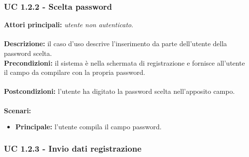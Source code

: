 \documentclass[a4paper,11pt]{article}
\begin{document}
\subsubsection{UC 1.2.2 - Scelta password}

\textbf{Attori principali:} \textit{utente non autenticato}.\\
\\
\textbf{Descrizione:} il caso d'uso descrive l'inserimento da parte dell'utente della password scelta.
\\
\textbf{Precondizioni:} il sistema è nella schermata di registrazione e fornisce all'utente il campo da compilare con la propria password.\\
\\
\textbf{Postcondizioni:} l'utente ha digitato la password scelta nell'apposito campo. \\
\\
\textbf{Scenari:}
\begin{itemize}
\item \textbf{Principale:} l'utente compila il campo password.

\end{itemize}

\vspace{6 mm}

\subsubsection{UC 1.2.3 - Invio dati registrazione}
\end{document}

